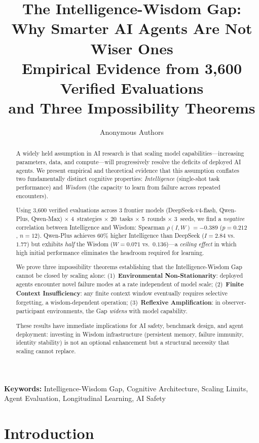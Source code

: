 \documentclass{article}
\title{
  \textbf{The Intelligence-Wisdom Gap:\\
  Why Smarter AI Agents Are Not Wiser Ones}\\[0.5em]
  \large Empirical Evidence from 3,600 Verified Evaluations\\
  and Three Impossibility Theorems
}
\author{Anonymous Authors}
\date{}
\begin{document}
\maketitle

\begin{abstract}
A widely held assumption in AI research is that scaling model capabilities---increasing
parameters, data, and compute---will progressively resolve the deficits of deployed
AI agents. We present empirical and theoretical evidence that this assumption
conflates two fundamentally distinct cognitive properties: \emph{Intelligence}
(single-shot task performance) and \emph{Wisdom} (the capacity to learn from
failure across repeated encounters).

Using 3,600 verified evaluations across 3 frontier models (DeepSeek-v4-flash,
Qwen-Plus, Qwen-Max) $\times$ 4~strategies $\times$ 20~tasks $\times$ 5~rounds
$\times$ 3~seeds, we find a \emph{negative} correlation between Intelligence
and Wisdom: Spearman $\rho(I, W) = -0.389$ ($p{=}0.212$, $n{=}12$).
Qwen-Plus achieves 60\% higher Intelligence than DeepSeek ($I{=}2.84$ vs.\
$1.77$) but exhibits \emph{half} the Wisdom ($W{=}0.071$ vs.\ $0.136$)---a
\emph{ceiling effect} in which high initial performance eliminates the
headroom required for learning.

We prove three impossibility theorems establishing that the Intelligence-Wisdom
Gap cannot be closed by scaling alone:
(1)~\textbf{Environmental Non-Stationarity}: deployed agents encounter novel
failure modes at a rate independent of model scale;
(2)~\textbf{Finite Context Insufficiency}: any finite context window eventually
requires selective forgetting, a wisdom-dependent operation;
(3)~\textbf{Reflexive Amplification}: in observer-participant environments,
the Gap \emph{widens} with model capability.

These results have immediate implications for AI safety, benchmark design, and
agent deployment: investing in Wisdom infrastructure (persistent memory, failure
immunity, identity stability) is not an optional enhancement but a structural
necessity that scaling cannot replace.
\end{abstract}

\textbf{Keywords:} Intelligence-Wisdom Gap, Cognitive Architecture, Scaling
Limits, Agent Evaluation, Longitudinal Learning, AI Safety

\section{Introduction}
\end{document}
